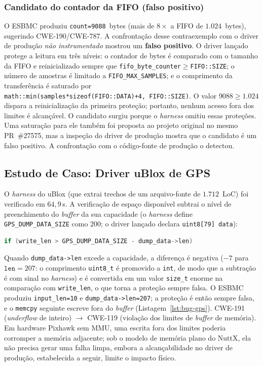 \documentclass[conference]{IEEEtran}
\begin{document}
\subsubsection{Candidato do contador da FIFO (falso positivo)}
O ESBMC produziu \texttt{count=9088}~bytes (mais de $8\times$ a FIFO
de $1.024$~bytes), sugerindo CWE-190/CWE-787.
A confrontação desse contraexemplo com o driver de produção
\emph{não instrumentado} mostrou um \textbf{falso positivo}. O driver
lançado protege a leitura em três níveis: o contador de bytes é
comparado com o tamanho da FIFO e reinicializado sempre que
\texttt{fifo\_byte\_counter}$\geq$\texttt{FIFO::SIZE}; o número de
amostras é limitado a \texttt{FIFO\_MAX\_SAMPLES}; e o comprimento da
transferência é saturado por
\texttt{math::min(samples*sizeof(FIFO::DATA)\allowbreak+4,~FIFO::SIZE)}.
O valor $9088\geq1.024$ dispara a reinicialização da primeira
proteção; portanto, nenhum acesso fora dos limites é alcançável. O
candidato surgiu porque o \textit{harness} omitiu essas proteções.
Uma saturação para ele também foi proposta ao projeto original no
mesmo PR~\#27575, mas a inspeção do driver de produção mostra que o
candidato é um falso positivo. A confrontação com o código-fonte de
produção o detectou.

\subsection{Estudo de Caso: Driver uBlox de GPS}
\label{subsec:case-gps}

O \textit{harness} do uBlox (que extrai trechos de um arquivo-fonte
de $1.712$~LoC) foi verificado em $64{,}9$\,s.
A verificação de espaço disponível subtrai o nível de preenchimento
do \textit{buffer} da sua capacidade (o \textit{harness} define
\texttt{GPS\_DUMP\_DATA\_SIZE} como $200$; o driver lançado declara
\texttt{uint8[79]~data}):
\begin{lstlisting}[language=C]
if (write_len > GPS_DUMP_DATA_SIZE - dump_data->len)
\end{lstlisting}
Quando \texttt{dump\_data->len} excede a capacidade, a diferença é
negativa ($-7$ para $\texttt{len}=207$: o comprimento
\texttt{uint8\_t} é promovido a \texttt{int}, de modo que a subtração
é com sinal no \textit{harness}) e é convertida em um valor
\texttt{size\_t} enorme na comparação com \texttt{write\_len}, o que
torna a proteção sempre falsa.
O ESBMC produziu \texttt{input\_len=10} e
\texttt{dump\_data->len=207}; a proteção é então sempre falsa, e o
\texttt{memcpy} seguinte escreve fora do \textit{buffer}
(Listagem~\ref{lst:bug-gps}).
CWE-191 (\textit{underflow} de inteiro) $\to$ CWE-119 (violação dos
limites de \textit{buffer} de memória).
Em hardware Pixhawk sem MMU, uma escrita fora dos limites poderia
corromper a memória adjacente; sob o modelo de memória plano do
NuttX, ela não precisa gerar uma falha limpa, embora a
alcançabilidade no driver de produção, estabelecida a seguir, limite
o impacto físico.
\end{document}
